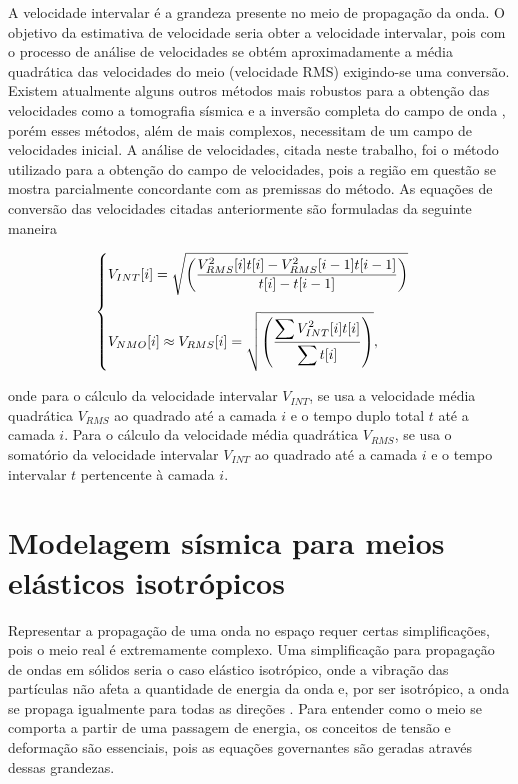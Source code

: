 \documentclass[
	12pt,				%
	openright,			%
	oneside,			%
	a4paper,			%
	english,			%
	brazil				%
	]{abntex2}
\begin{document}
    A velocidade intervalar é a grandeza presente no meio de propagação da onda. O objetivo da estimativa de velocidade seria obter a velocidade intervalar, pois com o processo de análise de velocidades se obtém aproximadamente a média quadrática das velocidades do meio (velocidade RMS) exigindo-se uma conversão. Existem atualmente alguns outros métodos mais robustos para a obtenção das velocidades como a tomografia sísmica \cite{bishop1985tomographic} e a inversão completa do campo de onda \cite{tarantola1984inversion}, porém esses métodos, além de mais complexos, necessitam de um campo de velocidades inicial. A análise de velocidades, citada neste trabalho, foi o método utilizado para a obtenção do campo de velocidades, pois a região em questão se mostra parcialmente concordante com as premissas do método. As equações de conversão das velocidades citadas anteriormente são formuladas da seguinte maneira \cite{dix1955seismic,yilmaz2001seismic}
    
    \begin{equation}
        \begin{cases}
            \bigskip V_{INT}[i] =  \sqrt{\left(\dfrac{V_{RMS}^2[i] t[i] - V_{RMS}^2[i-1] t[i-1]}{t[i] - t[i-1]}\right)}  \\
            V_{NMO}[i] \approx V_{RMS}[i] = \sqrt{\left(\dfrac{\displaystyle\sum V_{INT}^2[i]t[i]}{\displaystyle\sum t[i]}\right)},
        \end{cases}
        \label{dix}
    \end{equation}

    \noindent onde para o cálculo da velocidade intervalar $V_{INT}$, se usa a velocidade média quadrática $V_{RMS}$ ao quadrado até a camada $i$ e o tempo duplo total $t$ até a camada $i$. Para o cálculo da velocidade média quadrática $V_{RMS}$, se usa o somatório da velocidade intervalar $V_{INT}$ ao quadrado até a camada $i$ e o tempo intervalar $t$ pertencente à camada $i$.
    
\section{Modelagem sísmica para meios elásticos isotrópicos}

	Representar a propagação de uma onda no espaço requer certas simplificações, pois o meio real é extremamente complexo. Uma simplificação para propagação de ondas em sólidos seria o caso elástico isotrópico, onde a vibração das partículas não afeta a quantidade de energia da onda e, por ser isotrópico, a onda se propaga igualmente para todas as direções \cite{aki2002quantitative}. Para entender como o meio se comporta a partir de uma passagem de energia, os conceitos de tensão e deformação são essenciais, pois as equações governantes são geradas através dessas grandezas.   
\end{document}
